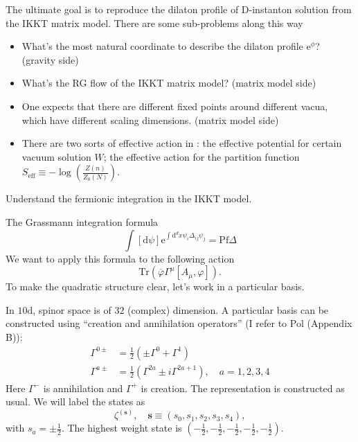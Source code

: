 \begin{problem}
	The ultimate goal is to reproduce the dilaton profile of D-instanton solution from the IKKT matrix model.
	There are some sub-problems along this way
	\begin{itemize}
		\item What's the most natural coordinate to describe the dilaton profile $\mathrm{e}^{\phi}$? (gravity side)
		\item What's the RG flow of the IKKT matrix model? (matrix model side)
		\item One expects that there are different fixed points around different vacua, which have different scaling dimensions. (matrix model side)
		\item There are two sorts of effective action in :
			the effective potential for certain vacuum solution $W$;
			the effective action for the partition function $S_{\text{eff}}\equiv -\log (\frac{Z(n)}{Z_0(N)})$.
	\end{itemize}
\end{problem}

\newpage

Understand the fermionic integration in the IKKT model.

The Grassmann integration formula
\begin{equation}
	\int [\mathrm{d}\psi]
	\mathrm{e}^{\int \mathrm{d}^d x \psi_i \Delta_{ij} \psi_j}
	= \mathrm{Pf} \Delta
\end{equation}
We want to apply this formula to the following action
\[
\mathrm{Tr} \left( \overline{\varphi} \Gamma^\mu
[A_\mu,\varphi]\right) 
.\] 
To make the quadratic structure clear,
let's work in a particular basis.

In $10 \mathrm{d}$, spinor space is of $32$ (complex) dimension.
A particular basis can be constructed using ``creation and annihilation operators'' (I refer to Pol (Appendix B)):
\begin{align*}
	\Gamma^{0\pm} &= \frac{1}{2} (\pm \Gamma^0 + \Gamma^1)\\
	\Gamma^{a\pm} &= \frac{1}{2} (\Gamma^{2a} \pm i \Gamma^{2a+1}),\quad
	a=1,2,3,4
\end{align*}
Here $\Gamma^-$ is annihilation and $\Gamma^+$ is creation.
The representation is constructed as usual.
We will label the states as
\[
	\zeta^{(\mathbf{s})},\quad \mathbf{s}\equiv (s_0,s_1,s_2,s_3,s_4)
,\] 
with $s_a = \pm \frac{1}{2}$.
The highest weight state is $(-\frac{1}{2},-\frac{1}{2},-\frac{1}{2},-\frac{1}{2},-\frac{1}{2})$.


